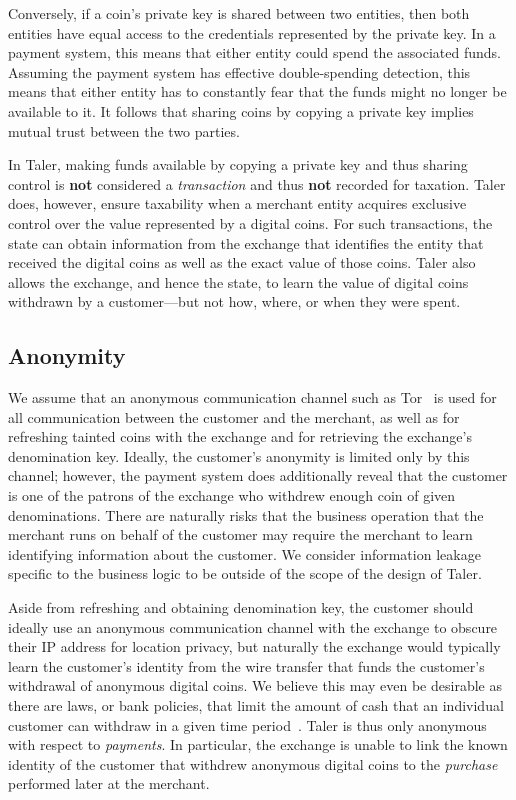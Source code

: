 \documentclass[sigconf, authordraft]{acmart}
\begin{document}
Conversely, if a coin's private key is shared between two entities,
then both entities have equal access to the credentials represented by
the private key.  In a payment system, this means that either entity
could spend the associated funds.  Assuming the payment system has
effective double-spending detection, this means that either entity has
to constantly fear that the funds might no longer be available to it.
It follows that sharing coins by copying a private key implies mutual
trust between the two parties.

In Taler, making funds available by copying a private key and thus
sharing control is {\bf not} considered a {\em transaction} and thus
{\bf not} recorded for taxation.  Taler does, however, ensure
taxability when a merchant entity acquires exclusive control over the
value represented by a digital coins.  For such transactions, the state
can obtain information from the exchange that identifies
the entity that received the digital coins as well as the exact value
of those coins.  Taler also allows the exchange, and hence the state,
to learn the value of digital coins withdrawn by a customer---but not
how, where, or when they were spent.

\subsection{Anonymity}

We assume that an anonymous communication channel
such as Tor~\cite{tor-design} is
used for all communication between the customer and the merchant,
as well as for refreshing tainted coins with the exchange and for
retrieving the exchange's denomination key.
Ideally, the customer's anonymity is limited only by this channel;
however, the payment system does additionally reveal that the customer
is one of the patrons of the exchange who withdrew enough coin of
given denominations.
There are naturally risks that the business operation that the
merchant runs on behalf of the customer
may require the merchant to learn identifying information about the customer.
We consider information leakage specific to the business logic to be
outside of the scope of the design of Taler.

Aside from refreshing and obtaining denomination key, the customer
should ideally use an anonymous communication channel with the exchange
to obscure their IP address for location privacy, but naturally
the exchange would typically learn the customer's identity from the wire
transfer that funds the customer's withdrawal of anonymous digital coins.
We believe this may even be desirable as there are laws, or bank policies,
that limit the amount of cash that an individual customer can withdraw
in a given time period~\cite{france2015cash,greece2015cash}.
Taler is thus only anonymous with respect to {\em payments}.
In particular, the exchange
is unable to link the known identity of the customer that withdrew
anonymous digital coins to the {\em purchase} performed later at the
merchant.
\end{document}
